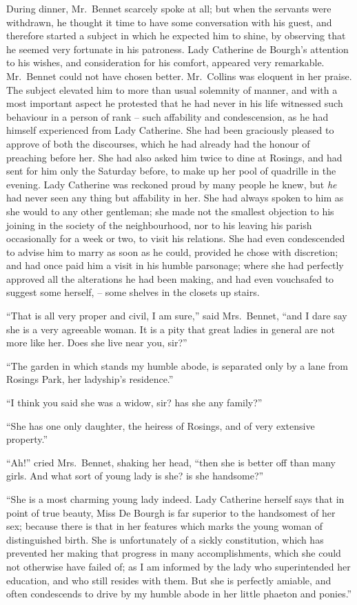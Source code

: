 During dinner, Mr.\ Bennet scarcely spoke at all; but
when the servants were withdrawn, he thought it time
to have some conversation with his guest, and therefore
started a subject in which he expected him to shine, by
observing that he seemed very fortunate in his patroness.
Lady Catherine de Bourgh’s attention to his wishes, and
consideration for his comfort, appeared very remarkable.
Mr.\ Bennet could not have chosen better. Mr.\ Collins
was eloquent in her praise. The subject elevated him to
more than usual solemnity of manner, and with a most
important aspect he protested that he had never in his
life witnessed such behaviour in a person of rank -- such
affability and condescension, as he had himself experienced
from Lady Catherine. She had been graciously pleased
to approve of both the discourses, which he had already
had the honour of preaching before her. She had also
asked him twice to dine at Rosings, and had sent for him
only the Saturday before, to make up her pool of quadrille
in the evening. Lady Catherine was reckoned proud by
many people he knew, but \textit{he} had never seen any thing
but affability in her. She had always spoken to him as
she would to any other gentleman; she made not the
smallest objection to his joining in the society of the
neighbourhood, nor to his leaving his parish occasionally
for a week or two, to visit his relations. She had even
condescended to advise him to marry as soon as he could,
provided he chose with discretion; and had once paid
him a visit in his humble parsonage; where she had
perfectly approved all the alterations he had been making,
and had even vouchsafed to suggest some herself, -- some
shelves in the closets up stairs.

“That is all very proper and civil, I am sure,” said
Mrs.\ Bennet, “and I dare say she is a very agreeable
woman. It is a pity that great ladies in general are not
more like her. Does she live near you, sir?”

“The garden in which stands my humble abode, is
separated only by a lane from Rosings Park, her ladyship’s
residence.”

“I think you said she was a widow, sir? has she any
family?”

“She has one only daughter, the heiress of Rosings,
and of very extensive property.”

“Ah!” cried Mrs.\ Bennet, shaking her head, “then
she is better off than many girls. And what sort of young
lady is she? is she handsome?”

“She is a most charming young lady indeed. Lady
Catherine herself says that in point of true beauty, Miss
De Bourgh is far superior to the handsomest of her sex;
because there is that in her features which marks the
young woman of distinguished birth. She is unfortunately
of a sickly constitution, which has prevented her
making that progress in many accomplishments, which
she could not otherwise have failed of; as I am informed
by the lady who superintended her education, and who
still resides with them. But she is perfectly amiable,
and often condescends to drive by my humble abode in
her little phaeton and ponies.”

